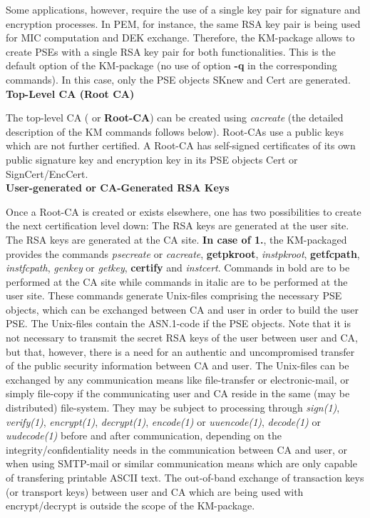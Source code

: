 Some applications, however, require the use of a single key pair for signature
and encryption processes. In PEM, for instance, the same RSA key pair is being used
for MIC computation and DEK exchange. Therefore, the KM-package allows to create
PSEs with a single RSA key pair for both functionalities. This is the default option
of the KM-package (no use of option {\bf -q} in the corresponding commands). 
In this case, only the PSE objects SKnew and Cert are generated.
\\[1em]
{\bf Top-Level CA (Root CA)}

The top-level CA ( or {\bf Root-CA}) can be created using {\em cacreate} (the detailed 
description of the KM commands follows below). Root-CAs use a public keys which are
not further certified. A Root-CA has self-signed certificates of its own public
signature key and encryption key in its PSE objects Cert or SignCert/EncCert.
\\ [1em]
{\bf User-generated or CA-Generated RSA Keys}

Once a Root-CA is created or exists elsewhere, one has two possibilities
to create the next certification level down:
\be
\m The RSA keys are generated at the user site.
\m The RSA keys are generated at the CA site.
\ee
{\bf In case of 1.}, the KM-packaged provides the commands {\em psecreate} or
{\em cacreate}, {\bf getpkroot}, {\em instpkroot}, {\bf getfcpath}, {\em instfcpath},
{\em genkey} or {\em getkey}, {\bf certify} and {\em instcert}. Commands in bold are
to be performed at the CA site while commands in italic are to be performed at the user site.
These commands generate Unix-files comprising the necessary PSE objects, 
which can be exchanged between CA and user
in order to build the user PSE. The Unix-files contain the ASN.1-code
if the PSE objects. Note that it is not necessary to transmit the secret 
RSA keys of the user between user and CA, but that, however, there is a need for an
authentic and uncompromised transfer of the public security information
between CA and user. The Unix-files can be exchanged by any communication means like 
file-transfer or electronic-mail, or simply file-copy if the communicating user and CA 
reside in the same (may be distributed) file-system. They may be subject to processing 
through {\em sign(1)}, {\em verify(1)}, {\em encrypt(1)},
{\em decrypt(1)}, {\em encode(1)} or {\em uuencode(1)}, {\em decode(1)} or {\em uudecode(1)}
before and after communication, depending on the integrity/confidentiality needs in the
communication between CA and user, or when using SMTP-mail or similar communication means 
which are only capable of transfering printable ASCII text. The out-of-band exchange
of transaction keys (or transport keys) between user and CA which are being used
with encrypt/decrypt is outside the scope of the KM-package.

